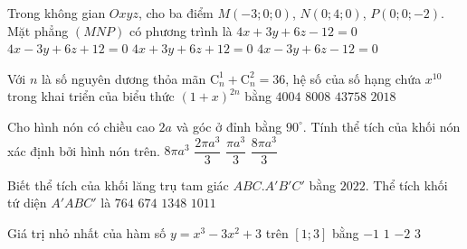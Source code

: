 \begin{ex}%
	Trong không gian $Oxyz$, cho ba điểm $M(-3;0;0)$, $N(0;4;0)$, $P(0;0;-2)$. Mặt phẳng $(MNP)$ có phương trình là
	\choice
	{$4x+3y+6z-12=0$}
	{\True $4x-3y+6z+12=0$}
	{$4x+3y+6z+12=0$}
	{$4x-3y+6z-12=0$}
\end{ex}
\begin{ex}%
	Với $n$ là số nguyên dương thỏa mãn $\mathrm{C}_n^1+\mathrm{C}_n^2=36$, hệ số của số hạng chứa $x^{10}$ trong khai triển của biểu thức $(1+x)^{2n}$ bằng
	\choice
	{$4004$}
	{\True $8008$}
	{$43758$}
	{$2018$}
\end{ex}
\begin{ex}%
	Cho hình nón có chiều cao $2a$ và góc ở đỉnh bằng $90^\circ$. Tính thể tích của khối nón xác định bởi hình nón trên.
	\choice
	{$8\pi a^3$}
	{$\dfrac{2\pi a^3}{3}$}
	{$\dfrac{\pi a^3}{3}$}
	{\True $\dfrac{8\pi a^3}{3}$}
\end{ex}
\begin{ex}%
	Biết thể tích của khối lăng trụ tam giác $ABC.A'B'C'$ bằng $2022$. Thể tích khối tứ diện $A'ABC'$ là
	\choice
	{$764$}
	{\True $674$}
	{$1348$}
	{$1011$}
\end{ex}
\begin{ex}%
	Giá trị nhỏ nhất của hàm số $y=x^3-3x^2+3$ trên $[1;3]$ bằng
	\choice
	{\True $-1$}
	{$1$}
	{$-2$}
	{$3$}
\end{ex}
